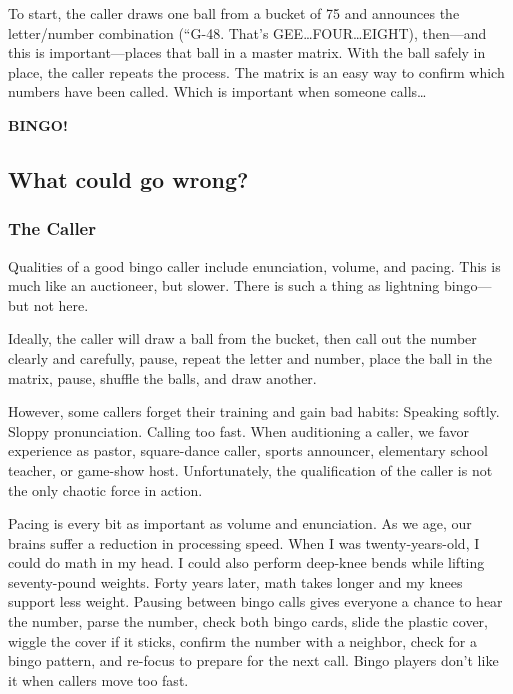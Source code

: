 \documentclass[
  letterpaper,
  DIV=11,
  numbers=noendperiod]{scrreprt}
\begin{document}
To start, the caller draws one ball from a bucket of 75 and announces
the letter/number combination (``G-48. That's
GEE\ldots FOUR\ldots EIGHT), then---and this is important---places that
ball in a master matrix. With the ball safely in place, the caller
repeats the process. The matrix is an easy way to confirm which numbers
have been called. Which is important when someone calls\ldots{}

\textbf{BINGO!}

\subsection*{What could go wrong?}\label{what-could-go-wrong}

\subsubsection*{The Caller}\label{the-caller}

Qualities of a good bingo caller include enunciation, volume, and
pacing. This is much like an auctioneer, but slower. There is such a
thing as lightning bingo---but not here.

Ideally, the caller will draw a ball from the bucket, then call out the
number clearly and carefully, pause, repeat the letter and number, place
the ball in the matrix, pause, shuffle the balls, and draw another.

However, some callers forget their training and gain bad habits:
Speaking softly. Sloppy pronunciation. Calling too fast. When
auditioning a caller, we favor experience as pastor, square-dance
caller, sports announcer, elementary school teacher, or game-show host.
Unfortunately, the qualification of the caller is not the only chaotic
force in action.

Pacing is every bit as important as volume and enunciation. As we age,
our brains suffer a reduction in processing speed. When I was
twenty-years-old, I could do math in my head. I could also perform
deep-knee bends while lifting seventy-pound weights. Forty years later,
math takes longer and my knees support less weight. Pausing between
bingo calls gives everyone a chance to hear the number, parse the
number, check both bingo cards, slide the plastic cover, wiggle the
cover if it sticks, confirm the number with a neighbor, check for a
bingo pattern, and re-focus to prepare for the next call. Bingo players
don't like it when callers move too fast.
\end{document}
